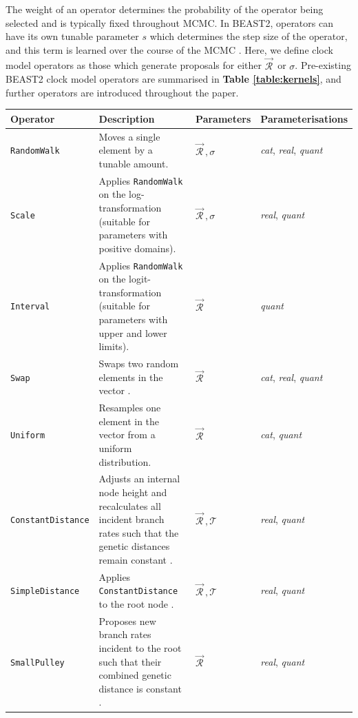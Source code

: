 \documentclass[10pt,letterpaper]{article}
\begin{document}
The weight of an operator determines the probability of the operator being selected and is typically fixed throughout MCMC.
In BEAST2, operators can have its own tunable parameter $s$ which determines the step size of the operator, and this term is learned over the course of the MCMC \cite{bouckaert2019beast}. 
Here, we define clock model operators as those which generate proposals for either $\vec{\mathcal{R}}^{\,}$ or $\sigma$.
Pre-existing BEAST2 clock model operators are summarised in \textbf{Table \ref{table:kernels}}, and further operators are introduced throughout the paper.


\begin{table}[h!]
\centering
\begin{tabular}{l p{4.2cm} l l} 
 \hline
 Operator & Description & Parameters & Parameterisations  \\
  \hline
 \texttt{RandomWalk} & Moves a single element by a tunable amount. & $\vec{\mathcal{R}}^{\,}, \sigma$ & \textit{cat}, \textit{real}, \textit{quant} \\
  \hline
\texttt{Scale} & Applies \texttt{RandomWalk} on the log-transformation (suitable for parameters with positive domains). & $\vec{\mathcal{R}}^{\,}, \sigma$ & \textit{real}, \textit{quant}  \\
  \hline
 \texttt{Interval} & Applies \texttt{RandomWalk} on the logit-transformation (suitable for parameters with upper and lower limits). & $\vec{\mathcal{R}}^{\,}$ & \textit{quant}  \\
  \hline
 \texttt{Swap} & Swaps two random elements in the vector \cite{drummond2006relaxed}. & $\vec{\mathcal{R}}^{\,}$  & \textit{cat}, \textit{real}, \textit{quant}  \\
 \hline
\texttt{Uniform} & Resamples one element in the vector from a uniform distribution. & $\vec{\mathcal{R}}^{\,}$  & \textit{cat}, \textit{quant}  \\
 \hline
\texttt{ConstantDistance} & Adjusts an internal node height and recalculates all incident branch rates such that the genetic distances remain constant \cite{zhang2020improving}.  & $\vec{\mathcal{R}}^{\,}, \mathcal{T}$ & \textit{real}, \textit{quant} \\
 \hline
\texttt{SimpleDistance} & Applies \texttt{ConstantDistance} to the root node \cite{zhang2020improving}.  & $\vec{\mathcal{R}}^{\,}, \mathcal{T}$ & \textit{real}, \textit{quant} \\
 \hline
\texttt{SmallPulley} & Proposes new branch rates incident to the root such that their combined genetic distance is constant  \cite{zhang2020improving}.  & $\vec{\mathcal{R}}^{\,}$ & \textit{real}, \textit{quant} \\

\end{tabular}
\end{table}
\end{document}

